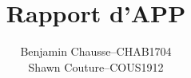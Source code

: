 \documentclass[a11paper]{article}
\title{Rapport d'APP}
\author{
  \addtolength{\tabcolsep}{-0.4em}
  \begin{tabular}{rcl} %
      Benjamin Chausse & -- & CHAB1704 \\
      Shawn Couture    & -- & COUS1912 \\
  \end{tabular}
}
\begin{document}
{\footnotesize
\maketitle
\newpage
\tableofcontents
\listoffigures
\listoftables
}

\newpage

\newpage


\newpage


\newpage


\newpage


\newpage

\end{document}
